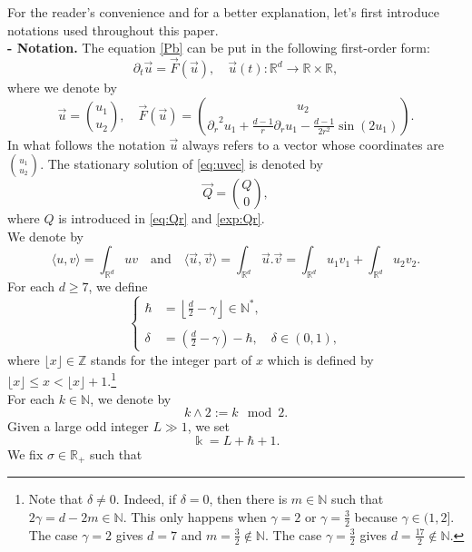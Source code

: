 \documentclass[11pt]{aims}
\theoremstyle{definition}
\numberwithin{equation}{section}
\begin{document}
For the reader's convenience and for a better explanation, let's first introduce notations used throughout this paper.\\
\noindent \textbf{- Notation.} The equation \eqref{Pb} can be put in the following first-order form:
\begin{equation}\label{eq:uvec}
{\partial_t} \vec{u} = \vec{F}(\vec u), \quad \vec u(t): {\mathbb{R}}^d \to {\mathbb{R}} \times {\mathbb{R}},
\end{equation}
where we denote by
$$\vec{u} = \binom{u_1}{u_2}, \quad \vec F(\vec u) = \binom{u_2}{{\partial_r}^2u_1 + \frac{d-1}{r}{\partial_r} u_1 - \frac{d-1}{2r^2}\sin(2u_1)}.$$
In what follows the notation $\vec u$ always refers to a vector whose coordinates are $\binom{u_1}{u_2}$. The stationary solution of \eqref{eq:uvec} is denoted by 
$$\vec{Q} = \binom{Q}{0},$$
where $Q$ is introduced in \eqref{eq:Qr} and \eqref{exp:Qr}. \\
We denote by
$$\big \langle u,v \big \rangle = \int_{{\mathbb{R}}^d}uv \quad \text{and} \quad \big \langle \vec u, \vec v \big \rangle = \int_{{\mathbb{R}}^d} \vec u . \vec v =  \int_{{\mathbb{R}}^d}u_1 v_1 + \int_{{\mathbb{R}}^d}u_2 v_2.$$ 
For each $d \geq 7$, we define
\begin{equation}\label{def:kdeltaplus}
\left\{\begin{array}{ll}
\hbar &= \left\lfloor\frac{d}{2} - \gamma\right\rfloor \in \mathbb{N}^*,\\
& \\
\delta &=\left(\frac{d}{2} - \gamma\right) - \hbar, \quad  \delta \in (0,1),
\end{array} \right.
\end{equation}
where $\lfloor x \rfloor \in \mathbb{Z}$ stands for the integer part of $x$ which is defined by $\lfloor x \rfloor \leq x < \lfloor x \rfloor + 1$.\footnote{Note that $\delta \ne 0$. Indeed, if $\delta = 0$, then there is $m \in \mathbb{N}$ such that $2\gamma = d - 2m \in \mathbb{N}$. This only happens when $\gamma = 2$ or $\gamma = \frac{3}{2}$ because $\gamma \in (1, 2]$. The case $\gamma = 2$ gives $d = 7$ and $m = \frac{3}{2} \not \in \mathbb{N}$. The case $\gamma = \frac{3}{2}$ gives $d = \frac{17}{2} \not \in \mathbb{N}$.}\\
For each $k \in \mathbb{N}$, we denote by 
$$k\wedge 2 := k \mod 2.$$
Given a large odd integer $L \gg 1$, we set
\begin{equation}\label{def:kbb}
\Bbbk = L + \hbar + 1.
\end{equation}
We fix $\sigma \in {\mathbb{R}}_+$ such that
\end{document}
